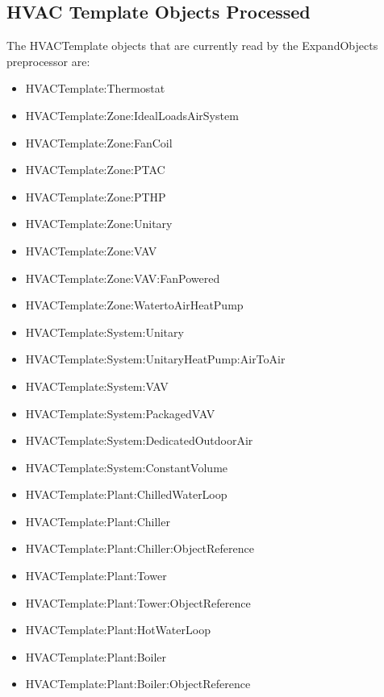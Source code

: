 \subsection{HVAC Template Objects Processed}\label{hvac-template-objects-processed}

The HVACTemplate objects that are currently read by the ExpandObjects preprocessor are:

\begin{itemize}
\item
  HVACTemplate:Thermostat
\item
  HVACTemplate:Zone:IdealLoadsAirSystem
\item
  HVACTemplate:Zone:FanCoil
\item
  HVACTemplate:Zone:PTAC
\item
  HVACTemplate:Zone:PTHP
\item
  HVACTemplate:Zone:Unitary
\item
  HVACTemplate:Zone:VAV
\item
  HVACTemplate:Zone:VAV:FanPowered
\item
  HVACTemplate:Zone:WatertoAirHeatPump
\item
  HVACTemplate:System:Unitary
\item
  HVACTemplate:System:UnitaryHeatPump:AirToAir
\item
  HVACTemplate:System:VAV
\item
  HVACTemplate:System:PackagedVAV
\item
  HVACTemplate:System:DedicatedOutdoorAir
\item
  HVACTemplate:System:ConstantVolume
\item
  HVACTemplate:Plant:ChilledWaterLoop
\item
  HVACTemplate:Plant:Chiller
\item
  HVACTemplate:Plant:Chiller:ObjectReference
\item
  HVACTemplate:Plant:Tower
\item
  HVACTemplate:Plant:Tower:ObjectReference
\item
  HVACTemplate:Plant:HotWaterLoop
\item
  HVACTemplate:Plant:Boiler
\item
  HVACTemplate:Plant:Boiler:ObjectReference
\end{itemize}
